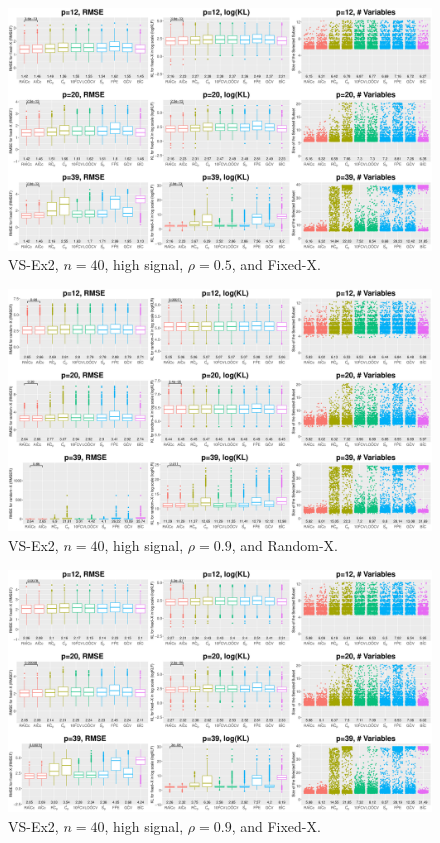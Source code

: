 \begin{figure}[!ht]
\centering
\includegraphics[width=\textwidth]{figures/supplement/fixedx_VS-Ex2_n40_hsnr_rho05.eps}
\caption{VS-Ex2, $n=40$, high signal, $\rho=0.5$, and Fixed-X.}
\end{figure}
\clearpage
\begin{figure}[!ht]
\centering
\includegraphics[width=\textwidth]{figures/supplement/randomx_VS-Ex2_n40_hsnr_rho09.eps}
\caption{VS-Ex2, $n=40$, high signal, $\rho=0.9$, and Random-X.}
\end{figure}
\begin{figure}[!ht]
\centering
\includegraphics[width=\textwidth]{figures/supplement/fixedx_VS-Ex2_n40_hsnr_rho09.eps}
\caption{VS-Ex2, $n=40$, high signal, $\rho=0.9$, and Fixed-X.}
\end{figure}
